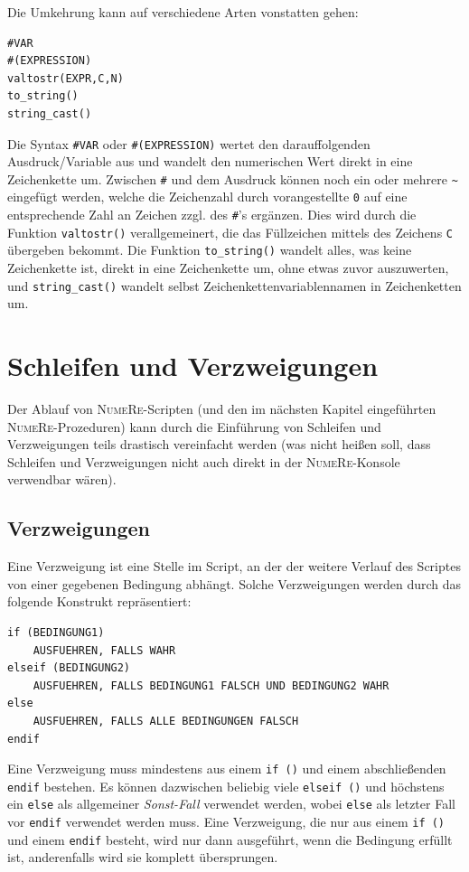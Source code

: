 \documentclass[DIV=14,headsepline,footsepline]{scrbook}
\newcommand{\NR}{\textsc{Nu\-me\-Re}}
\begin{document}
				Die Umkehrung kann auf verschiedene Arten vonstatten gehen:
				\begin{lstlisting}
#VAR
#(EXPRESSION)
valtostr(EXPR,C,N)
to_string()
string_cast()
				\end{lstlisting}
				Die Syntax \verb+#VAR+ oder \verb+#(EXPRESSION)+ wertet den darauffolgenden Ausdruck/Variable aus und wandelt den numerischen Wert direkt in eine Zeichenkette um. Zwischen \verb+#+ und dem Ausdruck können noch ein oder mehrere \verb+~+ eingefügt werden, welche die Zeichenzahl durch vorangestellte \verb+0+ auf eine entsprechende Zahl an Zeichen zzgl. des \verb+#+'s ergänzen. Dies wird durch die Funktion \verb+valtostr()+ verallgemeinert, die das Füllzeichen mittels des Zeichens \verb+C+ übergeben bekommt. Die Funktion \verb+to_string()+ wandelt alles, was keine Zeichenkette ist, direkt in eine Zeichenkette um, ohne etwas zuvor auszuwerten, und \verb+string_cast()+ wandelt selbst Zeichenkettenvariablennamen in Zeichenketten um.
		\chapter{Schleifen und Verzweigungen}
			Der Ablauf von \NR-Scripten (und den im nächsten Kapitel eingeführten \NR-Pro\-ze\-du\-ren) kann durch die Einführung von Schleifen und Verzweigungen teils drastisch vereinfacht werden (was nicht heißen soll, dass Schleifen und Verzweigungen nicht auch direkt in der \NR-Konsole verwendbar wären).
			\section{Verzweigungen}
				Eine Verzweigung ist eine Stelle im Script, an der der weitere Verlauf des Scriptes von einer gegebenen Bedingung abhängt. Solche Verzweigungen werden durch das folgende Konstrukt repräsentiert:
				\begin{lstlisting}
if (BEDINGUNG1)
	AUSFUEHREN, FALLS WAHR
elseif (BEDINGUNG2)
	AUSFUEHREN, FALLS BEDINGUNG1 FALSCH UND BEDINGUNG2 WAHR
else
	AUSFUEHREN, FALLS ALLE BEDINGUNGEN FALSCH
endif
				\end{lstlisting}
				
				Eine Verzweigung muss mindestens aus einem \verb+if ()+ und einem abschließenden \verb+endif+ bestehen. Es können dazwischen beliebig viele \verb+elseif ()+ und höchstens ein \verb+else+ als allgemeiner \emph{Sonst-Fall} verwendet werden, wobei \verb+else+ als letzter Fall vor \verb+endif+ verwendet werden muss. Eine Verzweigung, die nur aus einem \verb+if ()+ und einem \verb+endif+ besteht, wird nur dann ausgeführt, wenn die Bedingung erfüllt ist, anderenfalls wird sie komplett übersprungen.
				
\end{document}
